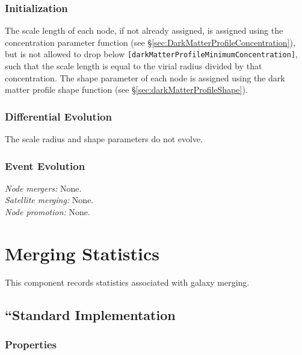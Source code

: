\subsubsection{Initialization}

The scale length of each node, if not already assigned, is assigned using the concentration parameter function (see \S\ref{sec:DarkMatterProfileConcentration}), but is not allowed to drop below {\tt [darkMatterProfileMinimumConcentration]}, such that the scale length is equal to the virial radius divided by that concentration. The shape parameter of each \gls{node} is assigned using the dark matter profile shape function (see \S\ref{sec:darkMatterProfileShape}).

\subsubsection{Differential Evolution}

The scale radius and shape parameters do not evolve.

\subsubsection{Event Evolution}

\noindent\emph{Node mergers:} None.\\

\noindent\emph{Satellite merging:} None.\\

\noindent\emph{Node promotion:} None.\\


\section{Merging Statistics}

This \gls{component} records statistics associated with galaxy merging.

\subsection{``Standard Implementation}

\subsubsection{Properties}

